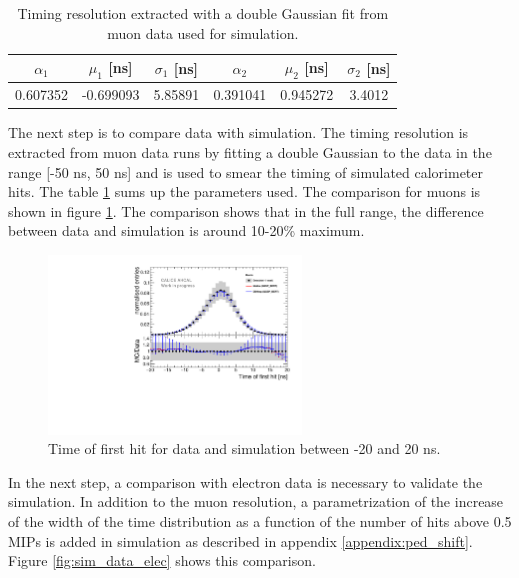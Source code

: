 \begin{table}[htb!]
	\centering
	\caption{Timing resolution extracted with a double Gaussian fit from muon data used for simulation.}
	\label{table:time_res_sim}
	\begin{tabular}{@{} cccccc @{}}
		\hline
		$\alpha_{1}$ & $\mu_{1}$ [ns] & $\sigma_{1}$ [ns] & $\alpha_{2}$ & $\mu_{2}$ [ns] & $\sigma_{2}$ [ns] \\
		\hline
		0.607352 & -0.699093 & 5.85891 & 0.391041 & 0.945272 & 3.4012 \\
		\hline
	\end{tabular}
\end{table}

The next step is to compare data with simulation. The timing resolution is extracted from muon data runs by fitting a double Gaussian to the data in the range [-50 ns, 50 ns] and is used to smear the timing of simulated calorimeter hits. The table \ref{table:time_res_sim} sums up the parameters used. The comparison for muons is shown in figure \ref{fig:sim_data_muon}. The comparison shows that in the full range, the difference between data and simulation is around 10-20\% maximum.

\begin{figure}[htbp!]
	\centering
	\includegraphics[width=0.6\textwidth]{../Thesis_Plots/Timing/Muons/Plots/Comparison_MokkaDD4hepData_Muons.pdf}
	\caption{Time of first hit for data and simulation between -20 and 20 ns.}
	\label{fig:sim_data_muon}
\end{figure}

In the next step, a comparison with electron data is necessary to validate the simulation. In addition to the muon resolution, a parametrization of the increase of the width of the time distribution as a function of the number of hits above 0.5 MIPs is added in simulation as described in appendix \ref{appendix:ped_shift}. Figure \ref{fig:sim_data_elec} shows this comparison.

